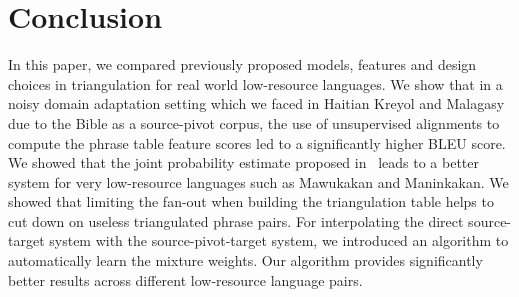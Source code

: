 \documentclass[11pt]{article}
\begin{document}
\section{Conclusion}
In this paper, we compared previously proposed models, features and design choices in triangulation for real world low-resource languages. We show that in a noisy domain adaptation setting which we faced in Haitian Kreyol and Malagasy due to the Bible as a source-pivot corpus, the use of unsupervised alignments to compute the phrase table feature scores led to a significantly higher BLEU score. We showed that the joint probability estimate proposed in~\cite{Cohn:07} leads to a better system for very low-resource languages such as Mawukakan and Maninkakan. We showed that limiting the fan-out when building the triangulation table helps to cut down on useless triangulated phrase pairs. For interpolating the direct source-target system with the source-pivot-target system, we introduced an algorithm to automatically learn the mixture weights. Our algorithm provides significantly better results across different low-resource language pairs.



\end{document}
